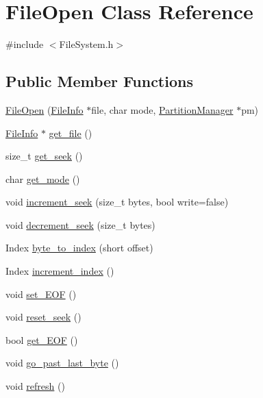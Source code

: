 \hypertarget{class_file_open}{}\section{File\+Open Class Reference}
\label{class_file_open}


{\ttfamily \#include $<$File\+System.\+h$>$}

\subsection*{Public Member Functions}
\begin{DoxyCompactItemize}
\item 
\mbox{\hyperlink{class_file_open_a387c8980a812856a3633ff162c1c1af4}{File\+Open}} (\mbox{\hyperlink{class_file_info}{File\+Info}} $\ast$file, char mode, \mbox{\hyperlink{class_partition_manager}{Partition\+Manager}} $\ast$pm)
\item 
\mbox{\hyperlink{class_file_info}{File\+Info}} $\ast$ \mbox{\hyperlink{class_file_open_ad1451c997a9300d20ba8e1af28fda08c}{get\+\_\+file}} ()
\item 
size\+\_\+t \mbox{\hyperlink{class_file_open_a8acd2b1d7f9cb2fe6030a75538ce62bb}{get\+\_\+seek}} ()
\item 
char \mbox{\hyperlink{class_file_open_a716c5d9b534be9cac550f3e64620514a}{get\+\_\+mode}} ()
\item 
void \mbox{\hyperlink{class_file_open_a8b178b10d2081d8c64a1218f11b9265a}{increment\+\_\+seek}} (size\+\_\+t bytes, bool write=false)
\item 
void \mbox{\hyperlink{class_file_open_a7e1fd46a093bef3a650e1d1e4d431cf7}{decrement\+\_\+seek}} (size\+\_\+t bytes)
\item 
Index \mbox{\hyperlink{class_file_open_a6d1374e052e3d9ba190e2797d9ae06a0}{byte\+\_\+to\+\_\+index}} (short offset)
\item 
Index \mbox{\hyperlink{class_file_open_abd29158f55f135ada0c5a0f25ee5ace6}{increment\+\_\+index}} ()
\item 
void \mbox{\hyperlink{class_file_open_a1523bffc4bc58984b53b309eb92cc8b9}{set\+\_\+\+E\+OF}} ()
\item 
void \mbox{\hyperlink{class_file_open_a1008411faf6df97c71d0ac0a867fce11}{reset\+\_\+seek}} ()
\item 
bool \mbox{\hyperlink{class_file_open_afc9043c99b42afaaa5f1712f5a45e066}{get\+\_\+\+E\+OF}} ()
\item 
void \mbox{\hyperlink{class_file_open_a966a424badc21c4cfc9b80854a052acb}{go\+\_\+past\+\_\+last\+\_\+byte}} ()
\item 
void \mbox{\hyperlink{class_file_open_ac10189670f476050bc3fdb44d74dcb33}{refresh}} ()
\end{DoxyCompactItemize}
